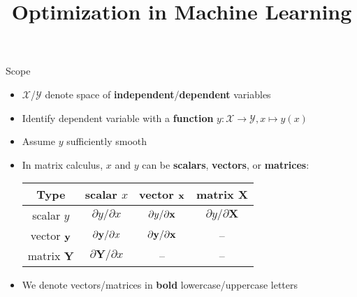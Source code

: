 \documentclass[11pt,compress,t,notes=noshow, xcolor=table]{beamer}
\title{Optimization in Machine Learning}
\date{}
\begin{document}
\lecture{\inserttitle}
\sloppy



\begin{vbframe}{Scope}
\begin{itemize}
    \setlength{\itemsep}{0.5\baselineskip}
    \item $\mathcal{X}$/$\mathcal{Y}$ denote space of \textbf{independent}/\textbf{dependent} variables
    \item Identify dependent variable with a \textbf{function} $y: \mathcal{X} \to \mathcal{Y}, x\mapsto y(x)$
    \item Assume $y$ sufficiently smooth
    \item In matrix calculus, $x$ and $y$ can be \textbf{scalars}, \textbf{vectors}, or \textbf{matrices}:
        \vspace{0.5\baselineskip}
        \begin{table}
            \centering
            \begin{tabular}{c||c|c|c}
                 Type & scalar $x$ & vector $\mathbf{x}$ & matrix $\mathbf{X}$ \\ \hline\hline
                 scalar $y$ & $\partial y / \partial x$ & $\partial y / \partial\mathbf{x}$ & $\partial y / \partial\mathbf{X}$ \\ \hline
                 vector $\mathbf{y}$ & $\partial\mathbf{y} / \partial x$ & $\partial\mathbf{y} / \partial\mathbf{x}$ & -- \\ \hline
                 matrix $\mathbf{Y}$ & $\partial\mathbf{Y} / \partial x$ & -- & --
            \end{tabular}
        \end{table}
    \item We denote vectors/matrices in \textbf{bold} lowercase/uppercase letters
\end{itemize}
\end{vbframe}
\end{document}
